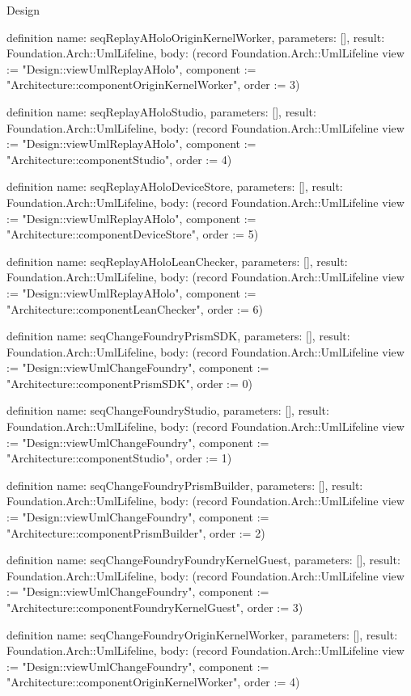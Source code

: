 \begin{lexlean}{Design}
\begin{semanticmodule}
definition{
  name: seqReplayAHoloOriginKernelWorker,
  parameters: [],
  result: Foundation.Arch::UmlLifeline,
  body: (record Foundation.Arch::UmlLifeline {view := "Design::viewUmlReplayAHolo", component := "Architecture::componentOriginKernelWorker", order := 3})
}

definition{
  name: seqReplayAHoloStudio,
  parameters: [],
  result: Foundation.Arch::UmlLifeline,
  body: (record Foundation.Arch::UmlLifeline {view := "Design::viewUmlReplayAHolo", component := "Architecture::componentStudio", order := 4})
}

definition{
  name: seqReplayAHoloDeviceStore,
  parameters: [],
  result: Foundation.Arch::UmlLifeline,
  body: (record Foundation.Arch::UmlLifeline {view := "Design::viewUmlReplayAHolo", component := "Architecture::componentDeviceStore", order := 5})
}

definition{
  name: seqReplayAHoloLeanChecker,
  parameters: [],
  result: Foundation.Arch::UmlLifeline,
  body: (record Foundation.Arch::UmlLifeline {view := "Design::viewUmlReplayAHolo", component := "Architecture::componentLeanChecker", order := 6})
}

definition{
  name: seqChangeFoundryPrismSDK,
  parameters: [],
  result: Foundation.Arch::UmlLifeline,
  body: (record Foundation.Arch::UmlLifeline {view := "Design::viewUmlChangeFoundry", component := "Architecture::componentPrismSDK", order := 0})
}

definition{
  name: seqChangeFoundryStudio,
  parameters: [],
  result: Foundation.Arch::UmlLifeline,
  body: (record Foundation.Arch::UmlLifeline {view := "Design::viewUmlChangeFoundry", component := "Architecture::componentStudio", order := 1})
}

definition{
  name: seqChangeFoundryPrismBuilder,
  parameters: [],
  result: Foundation.Arch::UmlLifeline,
  body: (record Foundation.Arch::UmlLifeline {view := "Design::viewUmlChangeFoundry", component := "Architecture::componentPrismBuilder", order := 2})
}

definition{
  name: seqChangeFoundryFoundryKernelGuest,
  parameters: [],
  result: Foundation.Arch::UmlLifeline,
  body: (record Foundation.Arch::UmlLifeline {view := "Design::viewUmlChangeFoundry", component := "Architecture::componentFoundryKernelGuest", order := 3})
}

definition{
  name: seqChangeFoundryOriginKernelWorker,
  parameters: [],
  result: Foundation.Arch::UmlLifeline,
  body: (record Foundation.Arch::UmlLifeline {view := "Design::viewUmlChangeFoundry", component := "Architecture::componentOriginKernelWorker", order := 4})
}


\end{semanticmodule}
\end{lexlean}
